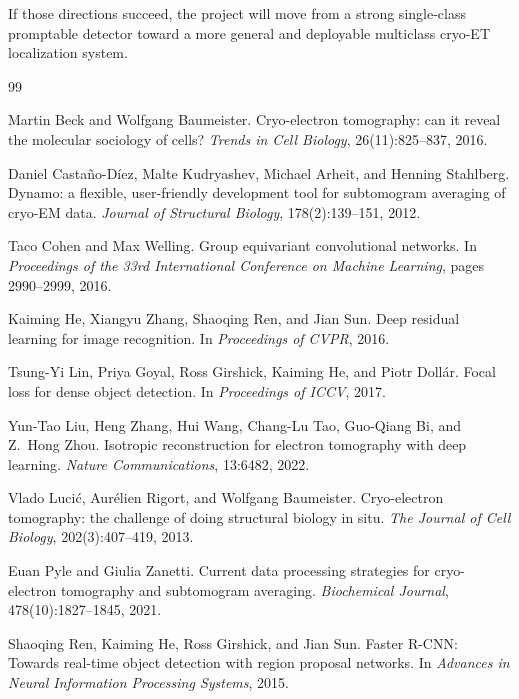 \documentclass[12pt,a4paper]{report}
\begin{document}
If those directions succeed, the project will move from a strong single-class promptable detector toward a more general and deployable multiclass cryo-ET localization system.

\begin{thebibliography}{99}

Martin Beck and Wolfgang Baumeister.
\newblock Cryo-electron tomography: can it reveal the molecular sociology of cells?
\newblock \emph{Trends in Cell Biology}, 26(11):825--837, 2016.

Daniel Casta\~no-D\'iez, Malte Kudryashev, Michael Arheit, and Henning Stahlberg.
\newblock Dynamo: a flexible, user-friendly development tool for subtomogram averaging of cryo-EM data.
\newblock \emph{Journal of Structural Biology}, 178(2):139--151, 2012.

Taco Cohen and Max Welling.
\newblock Group equivariant convolutional networks.
\newblock In \emph{Proceedings of the 33rd International Conference on Machine Learning}, pages 2990--2999, 2016.

Kaiming He, Xiangyu Zhang, Shaoqing Ren, and Jian Sun.
\newblock Deep residual learning for image recognition.
\newblock In \emph{Proceedings of CVPR}, 2016.

Tsung-Yi Lin, Priya Goyal, Ross Girshick, Kaiming He, and Piotr Doll\'ar.
\newblock Focal loss for dense object detection.
\newblock In \emph{Proceedings of ICCV}, 2017.

Yun-Tao Liu, Heng Zhang, Hui Wang, Chang-Lu Tao, Guo-Qiang Bi, and Z.~Hong Zhou.
\newblock Isotropic reconstruction for electron tomography with deep learning.
\newblock \emph{Nature Communications}, 13:6482, 2022.

Vlado Luci\'{c}, Aur\'elien Rigort, and Wolfgang Baumeister.
\newblock Cryo-electron tomography: the challenge of doing structural biology in situ.
\newblock \emph{The Journal of Cell Biology}, 202(3):407--419, 2013.

Euan Pyle and Giulia Zanetti.
\newblock Current data processing strategies for cryo-electron tomography and subtomogram averaging.
\newblock \emph{Biochemical Journal}, 478(10):1827--1845, 2021.

Shaoqing Ren, Kaiming He, Ross Girshick, and Jian Sun.
\newblock Faster R-CNN: Towards real-time object detection with region proposal networks.
\newblock In \emph{Advances in Neural Information Processing Systems}, 2015.


\end{thebibliography}
\end{document}
